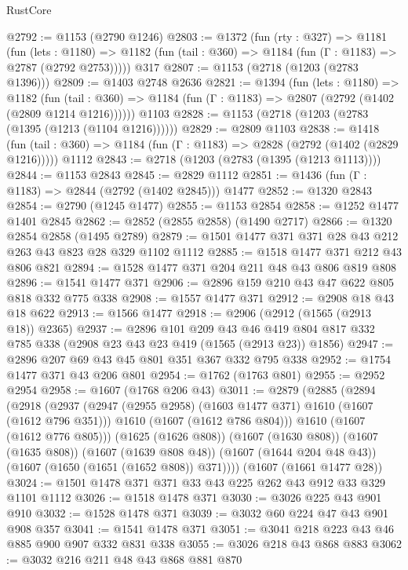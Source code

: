 \begin{lexlean}{RustCore}
\begin{coremodule}
@2792 := @1153 (@2790 @1246)
@2803 := @1372
    (fun (rty : @327) =>
    @1181
      (fun (lets : @1180) =>
      @1182 (fun (tail : @360) => @1184 (fun (Γ : @1183) => @2787 (@2792 @2753)))))
    @317
@2807 := @1153 (@2718 (@1203 (@2783 @1396)))
@2809 := @1403 @2748 @2636
@2821 := @1394
    (fun (lets : @1180) =>
    @1182
      (fun (tail : @360) => @1184 (fun (Γ : @1183) => @2807 (@2792 (@1402 (@2809 @1214 @1216))))))
    @1103
@2828 := @1153 (@2718 (@1203 (@2783 (@1395 (@1213 (@1104 @1216))))))
@2829 := @2809 @1103
@2838 := @1418
    (fun (tail : @360) => @1184 (fun (Γ : @1183) => @2828 (@2792 (@1402 (@2829 @1216)))))
    @1112
@2843 := @2718 (@1203 (@2783 (@1395 (@1213 @1113))))
@2844 := @1153 @2843
@2845 := @2829 @1112
@2851 := @1436 (fun (Γ : @1183) => @2844 (@2792 (@1402 @2845))) @1477
@2852 := @1320 @2843
@2854 := @2790 (@1245 @1477)
@2855 := @1153 @2854
@2858 := @1252 @1477 @1401 @2845
@2862 := @2852 (@2855 @2858) (@1490 @2717)
@2866 := @1320 @2854 @2858 (@1495 @2789)
@2879 := @1501 @1477 @371 @371 @28 @43 @212 @263 @43 @823 @28 @329 @1102 @1112
@2885 := @1518 @1477 @371 @212 @43 @806 @821
@2894 := @1528 @1477 @371 @204 @211 @48 @43 @806 @819 @808
@2896 := @1541 @1477 @371
@2906 := @2896 @159 @210 @43 @47 @622 @805 @818 @332 @775 @338
@2908 := @1557 @1477 @371
@2912 := @2908 @18 @43 @18 @622
@2913 := @1566 @1477
@2918 := @2906 (@2912 (@1565 (@2913 @18)) @2365)
@2937 := @2896
    @101
    @209
    @43
    @46
    @419
    @804
    @817
    @332
    @785
    @338
    (@2908 @23 @43 @23 @419 (@1565 (@2913 @23)) @1856)
@2947 := @2896 @207 @69 @43 @45 @801 @351 @367 @332 @795 @338
@2952 := @1754 @1477 @371 @43 @206 @801
@2954 := @1762 (@1763 @801)
@2955 := @2952 @2954
@2958 := @1607 (@1768 @206 @43)
@3011 := @2879
    (@2885
      (@2894
        (@2918
          (@2937
            (@2947 (@2955 @2958) (@1603 @1477 @371) @1610 (@1607 (@1612 @796 @351)))
            @1610
            (@1607 (@1612 @786 @804)))
          @1610
          (@1607 (@1612 @776 @805)))
        (@1625 (@1626 @808))
        (@1607 (@1630 @808))
        (@1607 (@1635 @808))
        (@1607 (@1639 @808 @48))
        (@1607 (@1644 @204 @48 @43))
        (@1607 (@1650 (@1651 (@1652 @808)) @371))))
    (@1607 (@1661 @1477 @28))
@3024 := @1501 @1478 @371 @371 @33 @43 @225 @262 @43 @912 @33 @329 @1101 @1112
@3026 := @1518 @1478 @371
@3030 := @3026 @225 @43 @901 @910
@3032 := @1528 @1478 @371
@3039 := @3032 @60 @224 @47 @43 @901 @908 @357
@3041 := @1541 @1478 @371
@3051 := @3041 @218 @223 @43 @46 @885 @900 @907 @332 @831 @338
@3055 := @3026 @218 @43 @868 @883
@3062 := @3032 @216 @211 @48 @43 @868 @881 @870

\end{coremodule}
\end{lexlean}
